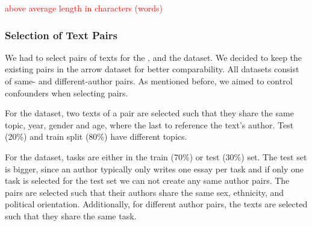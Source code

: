 \begin{table}[h]
\centering\small
\caption{Statistics of preprocessed datasets \dataPan{}, \dataBlog{} and \dataGutenberg{}.}
\label{tab:data_stats}
\end{table}
\textcolor{red}{above average length in characters (words)}

\subsubsection{Selection of Text Pairs}
\label{subsubsec:dataset_text_pair_selection}

We had to select pairs of texts for the \dataBlog{}, \dataStudent{} and the \dataGutenberg{} dataset.
We decided to keep the existing pairs in the \dataPan{} arrow dataset for better comparability.
All datasets consist of same- and different-author pairs. 
As mentioned before, we aimed to control confounders when selecting pairs.

For the \dataBlog{} dataset, 
two texts of a pair are selected such that they share the same topic, year, gender and age, where the last to reference the text's author.
Test (20\%) and train split (80\%) have different topics.

For the \dataStudent{} dataset,
tasks are either in the train (70\%) or test (30\%) set.
The test set is bigger, since an author typically only writes one essay per task and if only one task is selected for the test set we can not create any same author pairs.
The pairs are selected such that their authors share the same sex, ethnicity, and political orientation.
Additionally, for different author pairs, the texts are selected such that they share the same task.

